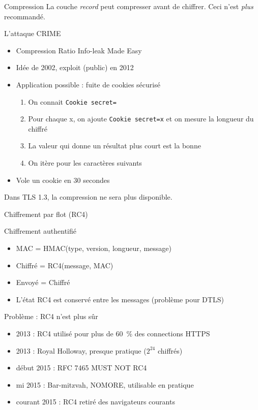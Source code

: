 \documentclass{mpg-ep-slides}
\begin{document}
\begin{frame}{Compression}
  La couche \emph{record} peut compresser avant de chiffrer. Ceci n'est
  \emph{plus} recommandé.

  \begin{block}{L'attaque CRIME}
    \begin{itemize}
      \item Compression Ratio Info-leak Made Easy
      \item Idée de 2002, exploit (public) en 2012
      \item Application possible : fuite de cookies sécurisé
        \begin{enumerate}
          \item On connait \texttt{Cookie secret=}
          \item Pour chaque x, on ajoute \texttt{Cookie secret=x} et on mesure
            la longueur du chiffré
          \item La valeur qui donne un résultat plus court est la bonne
          \item On itère pour les caractères suivants
        \end{enumerate}
      \item Vole un cookie en 30 secondes
    \end{itemize}
  \end{block}

  Dans TLS 1.3, la compression ne sera plus disponible.
\end{frame}

\begin{frame}{Chiffrement par flot (RC4)}
  \begin{block}{Chiffrement authentifié}
    \begin{itemize}
      \item MAC = HMAC(type, version, longueur, message)
      \item Chiffré = RC4(message, MAC)
      \item Envoyé = Chiffré
      \item L'état RC4 est conservé entre les messages (problème pour DTLS)
    \end{itemize}
  \end{block}

  \begin{block}{Problème : RC4 n'est plus sûr}
    \begin{itemize}
      \item 2013 : RC4 utilisé pour plus de 60~\% des connections HTTPS
      \item 2013 : Royal Holloway, presque pratique ($2^{24}$ chiffrés)
      \item début 2015 : RFC 7465 MUST NOT RC4
      \item mi 2015 : Bar-mitzvah, NOMORE, utilisable en pratique
      \item courant 2015 : RC4 retiré des navigateurs courants
    \end{itemize}
  \end{block}
\end{frame}
\end{document}
